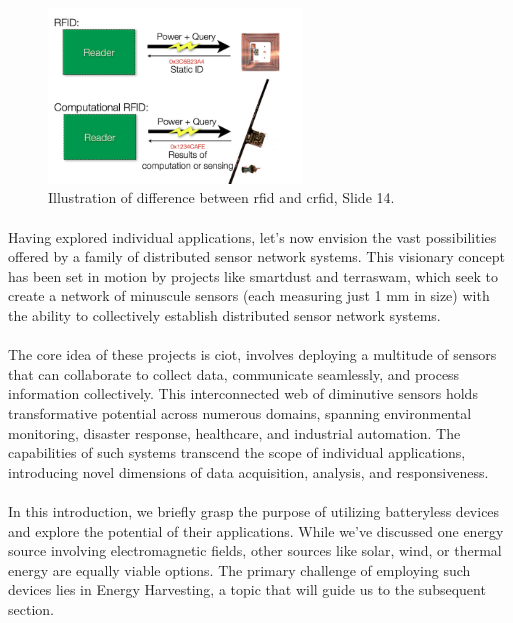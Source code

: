     \begin{figure}[htbp]
        \centering
        \includegraphics[width=0.6\textwidth]{img/chap2/Diagram_of_the_difference_between_RFID_and_computational_RFID.jpg}
        \caption{Illustration of difference between \gls{rfid} and \gls{crfid}\cite{presentationRfidEnergyAwareCheckpointing}, Slide 14.}
        \label{fig:energy-harvestingRFiD}
    \end{figure}

    \paragraph{}
        Having explored individual applications, let's now envision the vast possibilities offered by a family of distributed sensor network systems. This visionary concept has been set in motion by projects like \gls{smartdust} and \gls{terraswam}, which seek to create a network of minuscule sensors (each measuring just 1 mm in size) with the ability to collectively establish distributed sensor network systems.
    
    \paragraph{}
        The core idea of these projects is \gls{ciot}, involves deploying a multitude of sensors that can collaborate to collect data, communicate seamlessly, and process information collectively. This interconnected web of diminutive sensors holds transformative potential across numerous domains, spanning environmental monitoring, disaster response, healthcare, and industrial automation. The capabilities of such systems transcend the scope of individual applications, introducing novel dimensions of data acquisition, analysis, and responsiveness\cite{colloborativeIoT}.
    
    \paragraph{}
        In this introduction, we briefly grasp the purpose of utilizing \gls{batteryless} devices and explore the potential of their applications. While we've discussed one energy source involving electromagnetic fields, other sources like solar, wind, or thermal energy are equally viable options. The primary challenge of employing such devices lies in Energy Harvesting, a topic that will guide us to the subsequent section.
    

